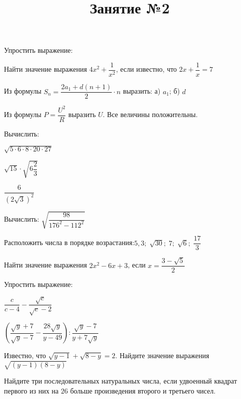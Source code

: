 \newpage
\title{Занятие №2}
\begin{listofex}
	\item Упростить выражение:
	\begin{enumcols}[itemcolumns=2]
		\item {}
		\item {}
	\end{enumcols}

\item Найти значение выражения \( 4x^2+\dfrac{1}{x^2} \), если известно, что \( 2x+\dfrac{1}{x}=7 \)
\item Из формулы \( S_n=\dfrac{2a_1+d(n+1)}{2}\cdot n \) выразить: а) \( a_1 \); б) \( d \)
\item Из формулы \( P=\dfrac{U^2}{R} \) выразить \( U \). Все величины положительны.

\item Вычислить:
\begin{enumcols}[itemcolumns=3]
	\item \( \sqrt{5\cdot6\cdot8\cdot20\cdot27} \)
	\item \( \sqrt{15}\cdot\sqrt{6\dfrac{2}{3}} \)
	\item \( \dfrac{6}{(2\sqrt{3})^2} \)
\end{enumcols}
\item Вычислить: \( \sqrt{\dfrac{98}{176^2-112^2}} \)
\item Расположить числа в порядке возрастания:\quad\( 5,3;\;\sqrt{30};\;7;\;\sqrt{6};\;\dfrac{17}{3} \)
\item Найти значение выражения \( 2x^2-6x+3 \), если \( x=\dfrac{3-\sqrt{5}}{2} \)
\item Упростить выражение:
\begin{enumcols}[itemcolumns=2]
	\item \( \dfrac{c}{c-4}-\dfrac{\sqrt{c}}{\sqrt{c}-2} \)
	\item \( \left( \dfrac{\sqrt{y}+7}{\sqrt{y}-7}-\dfrac{28\sqrt{y}}{y-49} \right):\dfrac{\sqrt{y}-7}{y+7\sqrt{y}} \)
\end{enumcols}
\item Известно, что \( \sqrt{y-1}+\sqrt{8-y}=2 \). Найдите значение выражения \( \sqrt{(y-1)(8-y)} \)
\item Найдите три последовательных натуральных числа, если удвоенный квадрат первого из них на \( 26 \) больше произведения второго и третьего чисел.
\end{listofex}
